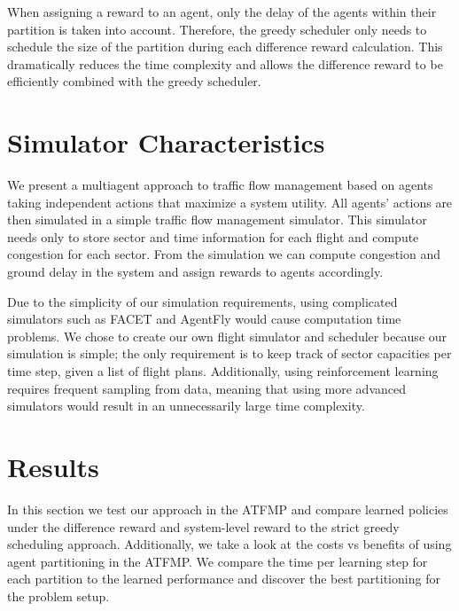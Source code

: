 \documentclass{aamas2014}
\begin{document}
When assigning a reward to an agent, only the delay of the agents within their partition is taken into account. Therefore, the greedy scheduler only needs to schedule the size of the partition during each difference reward calculation. This dramatically reduces the time complexity and allows the difference reward to be efficiently combined with the greedy scheduler. 

\section{Simulator Characteristics}
We present a multiagent approach to traffic flow management based on agents taking independent actions that maximize a system utility. All agents' actions are then simulated in a simple traffic flow management simulator. This simulator needs only to store sector and time information for each flight and compute congestion for each sector. From the simulation we can compute congestion and ground delay in the system and assign rewards to agents accordingly.

Due to the simplicity of our simulation requirements, using complicated simulators such as FACET \cite{FACET} and AgentFly \cite{Sislak:2008:AMA:1402744.1402755} would cause computation time problems. We chose to create our own flight simulator and scheduler because our simulation is simple; the only requirement is to keep track of sector capacities per time step, given a list of flight plans. Additionally, using reinforcement learning requires frequent sampling from data, meaning that using more advanced simulators would result in an unnecessarily large time complexity.

\section{Results}

In this section we test our approach in the ATFMP and compare learned policies under the difference reward and system-level reward to the strict greedy scheduling approach. Additionally, we take a look at the costs vs benefits of using agent partitioning in the ATFMP. We compare the time per learning step for each partition to the learned performance and discover the best partitioning for the problem setup. 
\end{document}
